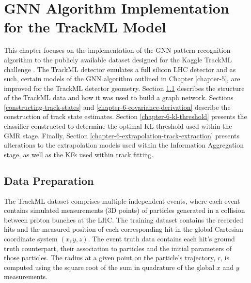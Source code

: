 


\chapter{GNN Algorithm Implementation for the TrackML Model}
\label{chapter-6}

This chapter focuses on the implementation of the GNN pattern recognition algorithm to the publicly available dataset designed for the Kaggle TrackML challenge \cite{kaggle-trackml}. The TrackML detector emulates a full silicon LHC detector and as such, certain models of the GNN algorithm outlined in Chapter \ref{chapter-5}, are improved for the TrackML detector geometry. Section \ref{chapter-6-data-prep} describes the structure of the TrackML data and how it was used to build a graph network. Sections \ref{constructing-track-states} and \ref{chapter-6-covariance-derivation} describe the construction of track state estimates. Section \ref{chapter-6-kl-threshold} presents the classifier constructed to determine the optimal KL threshold used within the GMR stage. Finally, Section \ref{chapter-6-extrapolation-track-extraction} presents alterations to the extrapolation models used within the Information Aggregation stage, as well as the KFs used within track fitting. 
 


\section{Data Preparation}
\label{chapter-6-data-prep}

The TrackML dataset \cite{kaggle-trackml-data} comprises multiple independent events, where each event contains simulated measurements (3D points) of particles generated in a collision between proton bunches at the LHC. The training dataset contains the recorded hits and the measured position of each corresponding hit in the global Cartesian coordinate system $(x, y, z)$. The event truth data contains each hit's ground truth counterpart, their association to particles and the initial parameters of those particles. The radius at a given point on the particle's trajectory, $r$, is computed using the square root of the sum in quadrature of the global $x$ and $y$ measurements.

